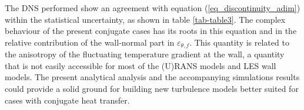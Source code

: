 \documentclass[review]{elsarticle}
\begin{document}



The DNS performed show an agreement with equation (\ref{eq_discontinuity_adim}) within the statistical uncertainty, as shown in table \ref{tab-table3}.
The complex behaviour of the present conjugate cases has its roots in this equation and in the relative contribution of the wall-normal part in $\varepsilon_{\theta,f}$.
This quantity is related to the anisotropy of the fluctuating temperature gradient at the wall, a quantity that is not easily accessible for most of the (U)RANS models and LES wall models.
The present analytical analysis and the accompanying simulations results could provide a solid ground for building new turbulence models better suited for cases with conjugate heat transfer.
\end{document}
